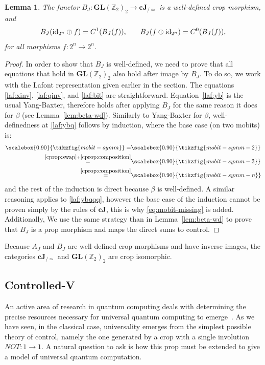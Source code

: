 \documentclass[a4paper]{article}
\theoremstyle{plain}
\newtheorem{lemma}[theorem]{Lemma}
\theoremstyle{definition}
\newcommand{\tf}[1]{\scalebox{0.90}{\tikzfig{#1}}}
\newcommand{\cat}[1]{\mathbf{#1}}
\newcommand{\ccat}[1]{\mathbf{c #1}}
\newcommand{\Z}{{\mathbb Z}}
\newcommand{\quo}{_{/\simeq}}
\newcommand{\iid}{\mathrm{id}}
\begin{document}
\begin{lemma}
	\label{lem:bj-wd}
	The functor $B_J \colon \cat{GL}(\Z_2)_2 \to \ccat J\quo$ is a well-defined
	crop morphism, and
	\[
		B_J(\iid_{2^n} \oplus f) = C^1(B_J(f)) \text,
		\qquad
		B_J(f \oplus \iid_{2^n}) = C^0(B_J(f)) \text,
	\]
	for all morphisms $f \colon 2^n \to 2^n$.
\end{lemma}
\begin{proof}
	In order to show that $B_J$ is well-defined, we need to prove that all
	equations that hold in $\cat{GL}(\Z_2)_2$ also hold after image by $B_J$.
	To do so, we work with the Lafont representation given earlier in the
	section. The equations \eqref{laf:xinv}, \eqref{laf:qinv}, and
	\eqref{laf:bit} are straightforward.
	Equation~\eqref{laf:yb} is the usual Yang-Baxter, therefore holds after
	applying $B_J$ for the same reason it does for $\beta$ (see
	Lemma~\ref{lem:beta-wd}). Similarly to Yang-Baxter for $\beta$,
	well-definedness at \eqref{laf:ybq} follows by induction, where the base
	case (on two mobits) is:
	\begin{align*}
		\tf{mobit-symm}
		=& \tf{mobit-symm-2} \\
		\stackrel{\ref{cprop:swap}+\ref{cprop:composition}}{=}& \tf{mobit-symm-3} \\
		\stackrel{\ref{cprop:composition}}{=}& \tf{mobit-symm-n}
	\end{align*}
	and the rest of the induction is direct because $\beta$ is well-defined. A
	similar reasoning applies to \eqref{laf:ybqqq}, however the base case of
	the induction cannot be proven simply by the rules of $\ccat J$, this is
	why \eqref{eq:mobit-missing} is added.
	Additionally, We use the same strategy than in Lemma~\ref{lem:beta-wd} to
	prove that $B_J$ is a prop morphism and maps the direct sums to control.
\end{proof}

Because $A_J$ and $B_J$ are well-defined crop morphisms and have inverse
images, the categories $\ccat J\quo$ and $\cat{GL}(\Z_2)_2$ are crop
isomorphic.

\subsection{Controlled-V}

An active area of research in quantum computing deals with determining
the precise resources necessary for universal quantum computing to
emerge~\cite{howardetal:contextuality, vedral:elusive,
 jozsalinden:entanglement}. As we have seen, in the classical case,
universality emerges from the simplest possible theory of control,
namely the one generated by a crop with a single involution
$NOT : 1 \to 1$. A natural question to ask is how this prop must be
extended to give a model of universal quantum computation.
\end{document}
